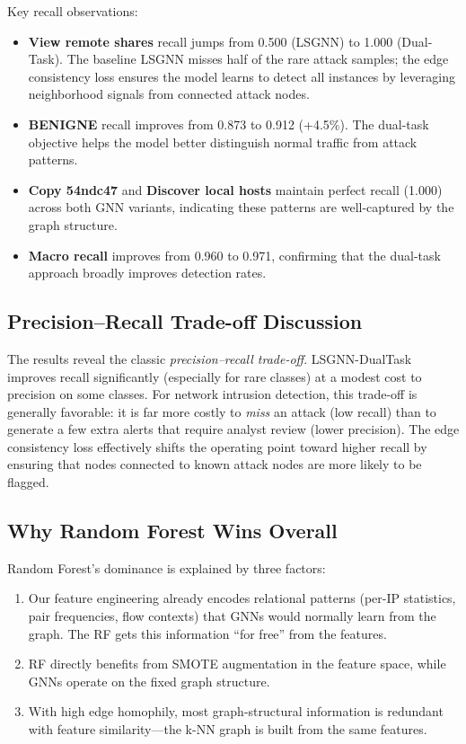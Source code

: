 \documentclass[conference]{IEEEtran}
\begin{document}
Key recall observations:
\begin{itemize}
    \item \textbf{View remote shares} recall jumps from 0.500 (LSGNN) to 1.000 (Dual-Task). The baseline LSGNN misses half of the rare attack samples; the edge consistency loss ensures the model learns to detect all instances by leveraging neighborhood signals from connected attack nodes.
    \item \textbf{BENIGNE} recall improves from 0.873 to 0.912 (+4.5\%). The dual-task objective helps the model better distinguish normal traffic from attack patterns.
    \item \textbf{Copy 54ndc47} and \textbf{Discover local hosts} maintain perfect recall (1.000) across both GNN variants, indicating these patterns are well-captured by the graph structure.
    \item \textbf{Macro recall} improves from 0.960 to 0.971, confirming that the dual-task approach broadly improves detection rates.
\end{itemize}

\subsection{Precision--Recall Trade-off Discussion}

The results reveal the classic \emph{precision--recall trade-off}. LSGNN-DualTask improves recall significantly (especially for rare classes) at a modest cost to precision on some classes. For network intrusion detection, this trade-off is generally favorable: it is far more costly to \emph{miss} an attack (low recall) than to generate a few extra alerts that require analyst review (lower precision). The edge consistency loss effectively shifts the operating point toward higher recall by ensuring that nodes connected to known attack nodes are more likely to be flagged.

\subsection{Why Random Forest Wins Overall}

Random Forest's dominance is explained by three factors:
\begin{enumerate}
    \item Our feature engineering already encodes relational patterns (per-IP statistics, pair frequencies, flow contexts) that GNNs would normally learn from the graph. The RF gets this information ``for free'' from the features.
    \item RF directly benefits from SMOTE augmentation in the feature space, while GNNs operate on the fixed graph structure.
    \item With high edge homophily, most graph-structural information is redundant with feature similarity---the k-NN graph is built from the same features.
\end{enumerate}
\end{document}
